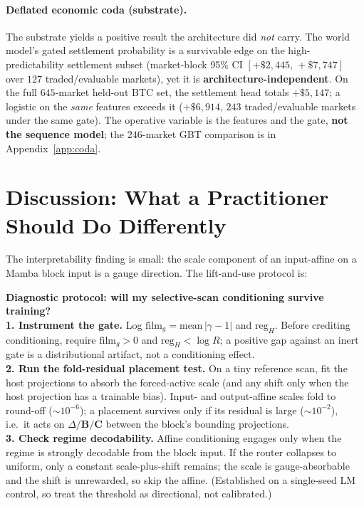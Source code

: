 \documentclass{article}
\begin{document}
\paragraph{Deflated economic coda (substrate).}\label{sec:coda}
The substrate yields a positive result the architecture did \emph{not} carry. The
world model's gated settlement probability is a survivable edge on the
high-predictability settlement subset (market-block 95\% CI
$[+\$2{,}445,\,+\$7{,}747]$ over $127$ traded/evaluable markets), yet it is
\textbf{architecture-independent}. On the full $645$-market held-out BTC set, the
settlement head totals $+\$5{,}147$; a logistic on the \emph{same} features exceeds
it ($+\$6{,}914$, $243$ traded/evaluable markets under the same gate). The operative
variable is the features and the gate, \textbf{not the sequence model}; the
$246$-market GBT comparison is in Appendix~\ref{app:coda}.

\section{Discussion: What a Practitioner Should Do Differently}\label{sec:discussion}

The interpretability finding is small: the scale component of an input-affine on a
Mamba block input is a gauge direction. The lift-and-use protocol is:

\begin{shaded}
\small
\noindent\textbf{Diagnostic protocol: will my selective-scan conditioning
survive training?}\\[2pt]
\textbf{1. Instrument the gate.} Log $\mathrm{film}_g=\mathrm{mean}\,|\gamma-1|$ and
$\mathrm{reg}_H$. Before crediting conditioning, require $\mathrm{film}_g>0$ and
$\mathrm{reg}_H<\log R$; a positive gap against an inert gate is a distributional
artifact, not a conditioning effect.\\[2pt]
\textbf{2. Run the fold-residual placement test.} On a tiny reference scan, fit the
host projections to absorb the forced-active scale (and any shift only when the host
projection has a trainable bias). Input- and output-affine scales fold to round-off
($\sim\!10^{-6}$); a placement survives only if its residual is large
($\sim\!10^{-2}$), i.e.\ it acts on $\Delta/\mathbf{B}/\mathbf{C}$ between the
block's bounding projections.\\[2pt]
\textbf{3. Check regime decodability.} Affine conditioning engages only when the
regime is strongly decodable from the block input. If the router collapses to
uniform, only a constant scale-plus-shift remains; the scale is gauge-absorbable and
the shift is unrewarded, so skip the affine. (Established on a single-seed LM
control, so treat the threshold as directional, not calibrated.)
\end{shaded}
\end{document}
